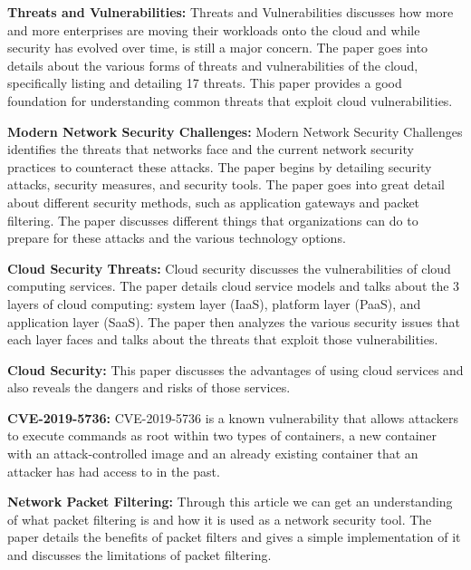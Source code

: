 \textbf{Threats and Vulnerabilities: } Threats and Vulnerabilities discusses how more and more enterprises are moving their workloads onto the cloud and while
security has evolved over time, is still a major concern. The paper goes into details about the various forms
of threats and vulnerabilities of the cloud, specifically listing and detailing 17 threats. This paper
provides a good foundation for understanding common threats that exploit cloud vulnerabilities. \cite{ctv}

\textbf{Modern Network Security Challenges: } Modern Network Security Challenges identifies the threats that networks face and the current network security practices to counteract these attacks.
The paper begins by detailing security attacks, security measures, and security tools. The paper goes into great detail about
different security methods, such as application gateways and packet filtering. The paper discusses different things that organizations
can do to prepare for these attacks and the various technology options. \cite{mns}

\textbf{Cloud Security Threats: } Cloud security discusses the vulnerabilities of cloud computing services. The paper details cloud service models and talks about
the 3 layers of cloud computing: system layer (IaaS), platform layer (PaaS), and application layer (SaaS). The paper then analyzes
the various security issues that each layer faces and talks about the threats that exploit those vulnerabilities. \cite{stc}

\textbf{Cloud Security: } This paper discusses the advantages of using cloud services and also reveals the dangers and risks of those services. \cite{cs}

\textbf{CVE-2019-5736: } CVE-2019-5736 is a known vulnerability that allows attackers to execute commands as root within two types of containers,
a new container with an attack-controlled image and an already existing container that an attacker has had access to in the past. \cite{cve}

\textbf{Network Packet Filtering: } Through this article we can get an understanding of what packet filtering is and how it is used as a network security tool.
The paper details the benefits of packet filters and gives a simple implementation of it and discusses
the limitations of packet filtering. \cite{tpf}
